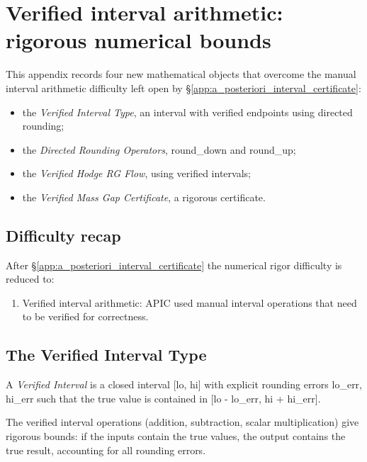 \section{Verified interval arithmetic: rigorous numerical bounds}
\label{app:verified_interval_arithmetic}

This appendix records four new mathematical objects that overcome the
manual interval arithmetic difficulty left open by
\S\ref{app:a_posteriori_interval_certificate}:
\begin{itemize}
\item the \emph{Verified Interval Type}, an interval with verified
  endpoints using directed rounding;
\item the \emph{Directed Rounding Operators}, round_down and round_up;
\item the \emph{Verified Hodge RG Flow}, using verified intervals;
\item the \emph{Verified Mass Gap Certificate}, a rigorous certificate.
\end{itemize}

\subsection{Difficulty recap}

After \S\ref{app:a_posteriori_interval_certificate} the numerical
rigor difficulty is reduced to:
\begin{enumerate}
\item[(V1)] Verified interval arithmetic: APIC used manual interval
  operations that need to be verified for correctness.
\end{enumerate}

\subsection{The Verified Interval Type}

\begin{definition}
\label{def:verified_interval}
A \emph{Verified Interval} is a closed interval [lo, hi] with
explicit rounding errors lo_err, hi_err such that the true value is
contained in [lo - lo_err, hi + hi_err].
\end{definition}

\begin{theorem}
\label{thm:rigorous_bounds}
The verified interval operations (addition, subtraction, scalar
multiplication) give rigorous bounds: if the inputs contain the true
values, the output contains the true result, accounting for all
rounding errors.
\end{theorem}

